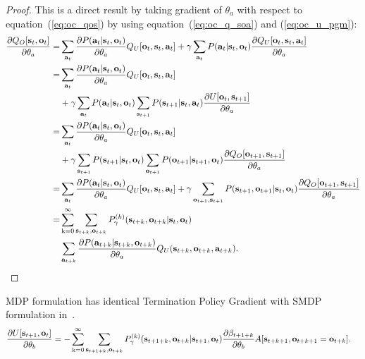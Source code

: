 \begin{proof}
  This is a direct result by taking gradient of $\theta_a$ with
  respect to equation~(\ref{eq:oc_qos}) by using
  equation~(\ref{eq:oc_q_soa}) and (\ref{eq:oc_u_pgm}):
\begin{align*}
  \frac{\partial Q_O[ {\mathbf{s}}_t,{\mathbf{o}}_t ]}{\partial \theta_a}=&\sum_{{\mathbf{a}}_t}\frac{\partial P({\mathbf{a}}_t|{\mathbf{s}}_t,{\mathbf{o}}_t)}{\partial \theta_a}Q_U[{\mathbf{o}}_t, {\mathbf{s}}_t,{\mathbf{a}}_t]+\gamma\sum_{{\mathbf{a}}_t}P({\mathbf{a}}_t|{\mathbf{s}}_t,{\mathbf{o}}_t)\frac{\partial Q_U[{\mathbf{o}}_t, {\mathbf{s}}_t,{\mathbf{a}}_t]}{\partial \theta_a}\\
  =&\sum_{{\mathbf{a}}_t}\frac{\partial P({\mathbf{a}}_t|{\mathbf{s}}_t,{\mathbf{o}}_t)}{\partial \theta_a}Q_U[{\mathbf{o}}_t, {\mathbf{s}}_t,{\mathbf{a}}_t]\\
                                                        &+ \gamma\sum_{{\mathbf{a}}_t}P({\mathbf{a}}_t|{\mathbf{s}}_t,{\mathbf{o}}_t)\sum_{{\mathbf{s}}_{t+1}}P({\mathbf{s}}_{t+1}|{\mathbf{s}}_t,{\mathbf{a}}_t)\frac{\partial U[{\mathbf{o}}_t,{\mathbf{s}}_{t+1}]}{\partial \theta_a}\\
  =&\sum_{{\mathbf{a}}_t}\frac{\partial P({\mathbf{a}}_t|{\mathbf{s}}_t,{\mathbf{o}}_t)}{\partial \theta_a}Q_U[{\mathbf{o}}_t, {\mathbf{s}}_t,{\mathbf{a}}_t]\\
                                                        &+ \gamma\sum_{{\mathbf{s}}_{t+1}}P({\mathbf{s}}_{t+1}|{\mathbf{s}}_t,{\mathbf{o}}_t)\sum_{{\mathbf{o}}_{t+1}}P({\mathbf{o}}_{t+1}|{\mathbf{s}}_{t+1},{\mathbf{o}}_t)\frac{\partial Q_O[{\mathbf{o}}_{t+1},{\mathbf{s}}_{t+1}]}{\partial \theta_a}\\
  =&\sum_{{\mathbf{a}}_t}\frac{\partial P({\mathbf{a}}_t|{\mathbf{s}}_t,{\mathbf{o}}_t)}{\partial \theta_a}Q_U[{\mathbf{o}}_t, {\mathbf{s}}_t,{\mathbf{a}}_t] + \gamma\sum_{{\mathbf{o}}_{t+1},{\mathbf{s}}_{t+1}}P({\mathbf{s}}_{t+1},{\mathbf{o}}_{t+1}|{\mathbf{s}}_{t},{\mathbf{o}}_t)\frac{\partial Q_O[{\mathbf{o}}_{t+1},{\mathbf{s}}_{t+1}]}{\partial \theta_a}\\
  =&\sum_{{\textnormal{k}}=0}^\infty\sum_{{\mathbf{s}}_{t+k},{\mathbf{o}}_{t+k}}P_\gamma^{(k)}({\mathbf{s}}_{t+k},{\mathbf{o}}_{t+k}|{\mathbf{s}}_t,{\mathbf{o}}_t)\\
                                                        &\sum_{{\mathbf{a}}_{t+k}}\frac{\partial P({\mathbf{a}}_{t+k}|{\mathbf{s}}_{t+k},{\mathbf{o}}_{t+k})}{\partial \theta_a}Q_U({\mathbf{s}}_{t+k},{\mathbf{o}}_{t+k},{\mathbf{a}}_{t+k}).
\end{align*}
\end{proof}

\begin{prop}
  \label{approp:oc_b_grad}
  MDP formulation has identical Termination Policy Gradient with
  SMDP formulation in~\cite{bacon2017option}.
  \begin{align}
    \label{eq:oc_b_grad}   \frac{\partial U[ {\mathbf{s}}_{t+1},{\mathbf{o}}_t ]}{\partial \theta_b}=
    -\sum_{{\textnormal{k}}=0}^\infty&\sum_{{\mathbf{s}}_{t+1+k},{\mathbf{o}}_{t+k}}P_\gamma^{(k)}({\mathbf{s}}_{t+1+k},{\mathbf{o}}_{t+k}|{\mathbf{s}}_{t+1},{\mathbf{o}}_t)
                         \frac{\partial \beta_{t+1+k}}{\partial \theta_b}A[ {\mathbf{s}}_{t+k+1},{\mathbf{o}}_{t+k+1}={\mathbf{o}}_{t+k}].
  \end{align}
\end{prop}

